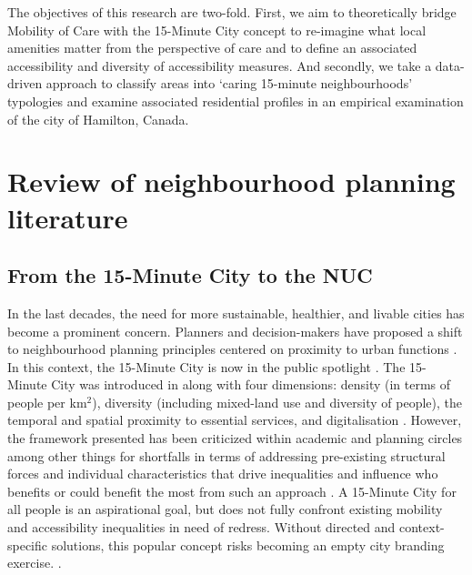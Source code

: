 \documentclass[
  authoryear,
  preprint,
  3p]{elsarticle}
\begin{document}
The objectives of this research are two-fold. First, we aim to
theoretically bridge Mobility of Care with the 15-Minute City concept to
re-imagine what local amenities matter from the perspective of care and
to define an associated accessibility and diversity of accessibility
measures. And secondly, we take a data-driven approach to classify areas
into `caring 15-minute neighbourhoods' typologies and examine associated
residential profiles in an empirical examination of the city of
Hamilton, Canada.

\section{Review of neighbourhood planning
literature}\label{review-of-neighbourhood-planning-literature}

\subsection{From the 15-Minute City to the
NUC}\label{from-the-15-minute-city-to-the-nuc}

In the last decades, the need for more sustainable, healthier, and
livable cities has become a prominent concern. Planners and
decision-makers have proposed a shift to neighbourhood planning
principles centered on proximity to urban functions
\citep{pozoukidou15MinuteCityDecomposing2021}. In this context, the
15-Minute City is now in the public spotlight
\citep{logan_xminute_2022, moreno_introducing_2021}. The 15-Minute City
was introduced in \citet{moreno_introducing_2021} along with four
dimensions: density (in terms of people per km\(^2\)), diversity
(including mixed-land use and diversity of people), the temporal and
spatial proximity to essential services, and digitalisation
\citep[q.v.][]{cerveroTravelDemand3Ds1997}. However, the framework
presented has been criticized within academic and planning circles
\citep[e.g.,][]{guzmanProximityEnoughCritical2024, mouratidisTimeChallenge15minute2024}
among other things for shortfalls in terms of addressing pre-existing
structural forces and individual characteristics that drive inequalities
and influence who benefits or could benefit the most from such an
approach
\citep{dimarino15minuteCityConcept2023, willberg15minuteCityAll2023}. A
15-Minute City for all people is an aspirational goal, but does not
fully confront existing mobility and accessibility inequalities in need
of redress. Without directed and context-specific solutions, this
popular concept risks becoming an empty city branding exercise.
\citep{pozoukidou15MinuteCityDecomposing2021, gowerPlanningInnovationCity2022}.
\end{document}
